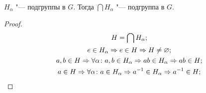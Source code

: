 \begin{theorem}{}
	$H_\alpha$ "--- подгруппы в $G$. Тогда $\bigcap H_\alpha$ "--- подгруппа в $G$.
\end{theorem}
\begin{proof}
    \begin{gather*}
	H = \bigcap H_\alpha; \\
	e \in H_{\alpha} \Rightarrow e \in H \Rightarrow H \ne \varnothing; \\
	a, b \in H \Rightarrow \forall \alpha\colon a, b \in H_\alpha \Rightarrow ab \in H_\alpha \Rightarrow ab \in H; \\
	a \in H \Rightarrow \forall \alpha \colon a \in H_\alpha \Rightarrow a^{-1} \in H_\alpha \Rightarrow a^{-1} \in H;
	\end{gather*}
\end{proof}
